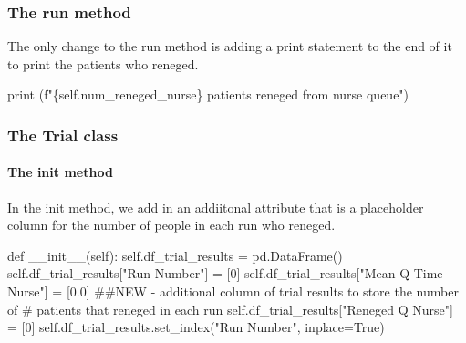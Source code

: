 \documentclass[
  letterpaper,
  DIV=11,
  numbers=noendperiod]{scrreprt}
\let\oldparagraph\paragraph
\renewcommand{\paragraph}[1]{\oldparagraph{#1}\mbox{}}
\newenvironment{Shaded}{\begin{snugshade}}{\end{snugshade}}
\newcommand{\BuiltInTok}[1]{\textcolor[rgb]{0.00,0.23,0.31}{#1}}
\newcommand{\CommentTok}[1]{\textcolor[rgb]{0.37,0.37,0.37}{#1}}
\newcommand{\DecValTok}[1]{\textcolor[rgb]{0.68,0.00,0.00}{#1}}
\newcommand{\FloatTok}[1]{\textcolor[rgb]{0.68,0.00,0.00}{#1}}
\newcommand{\FunctionTok}[1]{\textcolor[rgb]{0.28,0.35,0.67}{#1}}
\newcommand{\KeywordTok}[1]{\textcolor[rgb]{0.00,0.23,0.31}{#1}}
\newcommand{\NormalTok}[1]{\textcolor[rgb]{0.00,0.23,0.31}{#1}}
\newcommand{\OperatorTok}[1]{\textcolor[rgb]{0.37,0.37,0.37}{#1}}
\newcommand{\SpecialCharTok}[1]{\textcolor[rgb]{0.37,0.37,0.37}{#1}}
\newcommand{\SpecialStringTok}[1]{\textcolor[rgb]{0.13,0.47,0.30}{#1}}
\newcommand{\StringTok}[1]{\textcolor[rgb]{0.13,0.47,0.30}{#1}}
\newcommand{\VariableTok}[1]{\textcolor[rgb]{0.07,0.07,0.07}{#1}}
\begin{document}
\subsubsection{The run method}\label{the-run-method-3}

The only change to the run method is adding a print statement to the end
of it to print the patients who reneged.

\begin{Shaded}
\begin{Highlighting}[]
\BuiltInTok{print}\NormalTok{ (}\SpecialStringTok{f"}\SpecialCharTok{\{}\VariableTok{self}\SpecialCharTok{.}\NormalTok{num\_reneged\_nurse}\SpecialCharTok{\}}\SpecialStringTok{ patients reneged from nurse queue"}\NormalTok{)}
\end{Highlighting}
\end{Shaded}

\subsubsection{The Trial class}\label{the-trial-class-4}

\paragraph{\texorpdfstring{The \textbf{init}
method}{The init method}}\label{the-init-method-3}

In the init method, we add in an addiitonal attribute that is a
placeholder column for the number of people in each run who reneged.

\begin{Shaded}
\begin{Highlighting}[]
\KeywordTok{def}  \FunctionTok{\_\_init\_\_}\NormalTok{(}\VariableTok{self}\NormalTok{):}
    \VariableTok{self}\NormalTok{.df\_trial\_results }\OperatorTok{=}\NormalTok{ pd.DataFrame()}
    \VariableTok{self}\NormalTok{.df\_trial\_results[}\StringTok{"Run Number"}\NormalTok{] }\OperatorTok{=}\NormalTok{ [}\DecValTok{0}\NormalTok{]}
    \VariableTok{self}\NormalTok{.df\_trial\_results[}\StringTok{"Mean Q Time Nurse"}\NormalTok{] }\OperatorTok{=}\NormalTok{ [}\FloatTok{0.0}\NormalTok{]}
    \CommentTok{\#\#NEW {-} additional column of trial results to store the number of}
    \CommentTok{\# patients that reneged in each run}
    \VariableTok{self}\NormalTok{.df\_trial\_results[}\StringTok{"Reneged Q Nurse"}\NormalTok{] }\OperatorTok{=}\NormalTok{ [}\DecValTok{0}\NormalTok{]}
    \VariableTok{self}\NormalTok{.df\_trial\_results.set\_index(}\StringTok{"Run Number"}\NormalTok{, inplace}\OperatorTok{=}\VariableTok{True}\NormalTok{)}
\end{Highlighting}
\end{Shaded}
\end{document}
